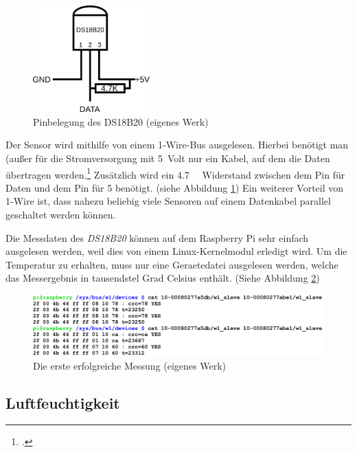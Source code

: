 \begin{figure}[h]
  \centering
     \includegraphics[width=0.4\textwidth]{figures/temp_pin.png}
  \caption{Pinbelegung des DS18B20 (eigenes Werk)}
  \label{fig:temp_pin}
\end{figure}

Der Sensor wird mithilfe von einem \gls{1-Wire}-\gls{Bus} ausgelesen. Hierbei benötigt man (außer für die Stromversorgung mit \SI{5}{\gls{Volt}} nur ein Kabel, auf dem die Daten übertragen werden.\footcite{1-wire} Zusätzlich wird ein \SI{4.7}{\kilo{}} Widerstand zwischen dem Pin für Daten und dem Pin für \SI[retain-explicit-plus]{+5}{} benötigt. (siehe Abbildung \ref{fig:temp_pin})
Ein weiterer Vorteil von 1-Wire ist, dass nahezu beliebig viele Sensoren auf einem Datenkabel parallel geschaltet werden können.

Die Messdaten des \emph{DS18B20} können auf dem Raspberry Pi sehr einfach ausgelesen werden, weil dies von einem Linux-\gls{Kernelmodul} erledigt wird. Um die Temperatur zu erhalten, muss  nur eine \gls{Geraetedatei} ausgelesen werden, welche das Messergebnis in tausendstel Grad Celsius enthält. (Siehe Abbildung \ref{fig:temp_screenshot})

\begin{figure}[h]
  \centering
     \includegraphics[width=\textwidth]{figures/temp_screenshot.png}
  \caption{Die erste erfolgreiche Messung (eigenes Werk)}
  \label{fig:temp_screenshot}
\end{figure}

\subsection{Luftfeuchtigkeit}
\label{subsec:Luftfeuchtigkeit}

